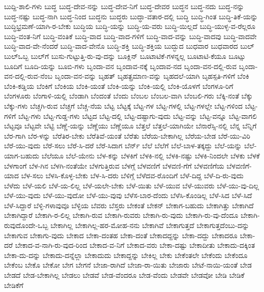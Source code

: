 {ಬುದ್ದಿ-ಶಾಲಿ-ಗಳು
ಬುದ್ಧ
ಬುದ್ಧ-ದೇವ-ನನ್ನು
ಬುದ್ಧ-ದೇವ-ನಿಗೆ
ಬುದ್ಧ-ದೇವರ
ಬುದ್ಧನ
ಬುದ್ಧ-ನದು
ಬುದ್ಧ-ನನ್ನು
ಬುದ್ಧ-ನಷ್ಟು
ಬುದ್ಧ-ನಾಗಿ
ಬುದ್ಧ-ನಿಂದ
ಬುದ್ಧನು
ಬುದ್ಧರು
ಬುದ್ಧಾ-ವತಾರ-ದಲ್ಲಿ
ಬುದ್ಧಿ
ಬುದ್ಧಿ-ಗಿಂತ
ಬುದ್ಧಿ-ತಿಕೆ-ಯನ್ನು
ಬುದ್ಧಿಭ್ರಮಣೆ-ಯಾಗಿ-ರ-ಬೇಕು
ಬುದ್ಧಿಯ
ಬುದ್ಧಿ-ಯನ್ನು
ಬುದ್ಧಿ-ಯ-ವರು
ಬುದ್ಧಿ-ಯಿಲ್ಲದೆ
ಬುದ್ಧಿ-ಯುಳ್ಳ-ವ-ರೆಲ್ಲರೂ
ಬುದ್ಧಿ-ವಂತ-ನಿಗೆ
ಬುದ್ಧಿ-ವಂತಿಕೆ
ಬುದ್ಧಿ-ವಾದ
ಬುದ್ಧಿ-ವಾದ-ಗಳಿಗೆ
ಬುದ್ಧಿ-ವಾದ-ವನ್ನು
ಬುದ್ಧಿ-ವಾದವು
ಬುದ್ಧಿ-ವಾದವೇ
ಬುದ್ಧಿ-ವಾದ-ವೇ-ನೆಂದರೆ
ಬುದ್ಧಿ-ವಾದ-ವೇನೊ
ಬುದ್ಧಿ-ಶಕ್ತಿ
ಬುದ್ಧಿ-ಶಕ್ತಿಯ
ಬುದ್ಭುದ
ಬುಧವಾರ
ಬುಧವಾರದ
ಬುಲ್
ಬುಲ್ಒಬ್ಬ
ಬುಲ್‌ಗೆ
ಬುಸು-ಗುಟ್ಟುತ್ತಿ-ರು-ವು-ದನ್ನು
ಬೂಕ್ಲಿನ್
ಬೂಟಾಟಿಕೆ-ಗಳನ್ನಲ್ಲ
ಬೂಟಾಟಿ-ಕೆಯೂ
ಬೂಟ್ಸು
ಬೂದಿಗೆ
ಬೂದಿ-ಯನ್ನು
ಬೂಬಿ-ಗಳು
ಬೃಂದಾ-ವನ
ಬೃಂದಾವ-ನಕ್ಕೆ
ಬೃಂದಾವ-ನದ
ಬೃಂದಾ-ವನ-ದಲ್ಲಿ-ರುವ
ಬೃಂದಾ-ವನ-ದಲ್ಲಿ-ರುವ-ನೆಂಬ
ಬೃಂದಾ-ವನ-ವನ್ನು
ಬೃಹತ್
ಬೃಹತ್ಪ್ರಮಾಣ-ವನ್ನು
ಬೃಹದಲೆ-ಯಾಗಿ
ಬೃಹಸ್ಪತಿ-ಗಳಿಗೆ
ಬೆಂಕಿ
ಬೆಂಕಿ-ಕಡ್ಡಿಯ
ಬೆಂಕಿಗೆ
ಬೆಂಕಿಯ
ಬೆಂಕಿ-ಯಂತೆ
ಬೆಂಕಿ-ಯನ್ನು
ಬೆಂಕಿ-ಯಲ್ಲಿ
ಬೆಂಕಿ-ಯೊಳಗೆ
ಬೆಂಗಳೂ-ರಿಗೆ
ಬೆಂಗಳೂರು
ಬೆಂಗಾಳಿ-ಯಲ್ಲಿ
ಬೆಂಡಾಗಿ
ಬೆಂದಂತೆ
ಬೆಂದು
ಬೆಂಬಲ
ಬೆಂಬಲ-ವಾಗಿ
ಬೆಂಬಲಿ-ಗರು
ಬೆಕ್ಕಿ-ನಂತೆ
ಬೆಕ್ಕು
ಬೆಕ್ಕು-ಗಳು
ಬೆಚ್ಚಗಿ-ರುವ
ಬೆಚ್ಚಗೆ
ಬೆಚ್ಚ-ನೆಯ
ಬೆಟ್ಟ
ಬೆಟ್ಟಕ್ಕೆ
ಬೆಟ್ಟ-ಗಳ
ಬೆಟ್ಟ-ಗಳಲ್ಲಿ
ಬೆಟ್ಟ-ಗಳಲ್ಲೇ
ಬೆಟ್ಟ-ಗಳಿಂದ
ಬೆಟ್ಟ-ಗಳಿಗೆ
ಬೆಟ್ಟ-ಗಳು
ಬೆಟ್ಟ-ಗುಡ್ಡ-ಗಳು
ಬೆಟ್ಟದ
ಬೆಟ್ಟ-ದಲ್ಲಿ
ಬೆಟ್ಟ-ದಷ್ಟಾಗು-ವುದು
ಬೆಟ್ಟ-ವನ್ನು
ಬೆಟ್ಟ-ವನ್ನೂ
ಬೆಟ್ಟ-ವಾಗಲಿ
ಬೆಟ್ಟವೂ
ಬೆಟ್ಟವೇ
ಬೆಟ್ಟಿ
ಬೆಣ್ಣೆ-ಯನ್ನು
ಬೆಣ್ಣೆಯು
ಬೆಣ್ಣೆಯೂ
ಬೆತ್ತಲೆ
ಬೆತ್ತಲೆ-ಯಾಗಿಯೇ
ಬೆನಾರೆಸ್ಸಿ-ನಲ್ಲಿ
ಬೆನ್ನ
ಬೆನ್ನಿಗೆ
ಬೆರ-ಗಾಗಿ
ಬೆರ-ಳನ್ನು
ಬೆರೆತಿರ-ಬೇಕು
ಬೆರೆತಿವೆ-ಯಂತೆ
ಬೆರೆತು
ಬೆರೆಯ-ಬೇಕಾಗಿಲ್ಲ
ಬೆರೆಯ-ಬೇಡ
ಬೆರೆ-ಯು-ವಿರಿ
ಬೆರೆ-ಯು-ವುದು
ಬೆರೆ-ಸಲು
ಬೆರೆ-ಸಿ-ದರೆ
ಬೆರೆ-ಸಿದಾಗ
ಬೆರ್ನ್
ಬೆಲೆ
ಬೆಲೆಗೆ
ಬೆಲೆ-ಬಾಳ-ತಕ್ಕದ್ದು
ಬೆಲೆ-ಯನ್ನು
ಬೆಲೆ-ಯಾಗ-ಬಹುದು
ಬೆಲೆಯೂ
ಬೆಲೆ-ಯೇನು
ಬೆಳ-ಕನ್ನು
ಬೆಳಕಿಗೆ
ಬೆಳಕಿ-ನಲ್ಲಿ
ಬೆಳಕಿ-ನಷ್ಟು
ಬೆಳಕಿ-ನಿಂದಲೇ
ಬೆಳಕು
ಬೆಳಕೆ
ಬೆಳಗಾಂಗೆ
ಬೆಳ-ಗಿನ
ಬೆಳಗಿ-ನಂತೆಯೇ
ಬೆಳಗುತ್ತಿರುವ
ಬೆಳಗ್ಗೆ
ಬೆಳವಣಿಗೆ
ಬೆಳವಣಿ-ಗೆಗೆ
ಬೆಳವಣಿಗೆಯ
ಬೆಳವಣಿಗೆ-ಯಾದ
ಬೆಳ-ಸಲು
ಬೆಳಸಿ-ಕೊಳ್ಳ-ಬೇಕು
ಬೆಳ-ಸಿ-ದರು
ಬೆಳಿಗ್ಗೆ
ಬೆಳೆದವ-ರೊಂದಿಗೆ
ಬೆಳೆ-ದಿದ್ದ
ಬೆಳೆ-ದಿ-ರು-ವುದು
ಬೆಳೆದು
ಬೆಳೆ-ಯಲಿ
ಬೆಳೆ-ಯ-ಲಿಲ್ಲ
ಬೆಳೆ-ಯಲೇ-ಬೇಕು
ಬೆಳೆ-ಯಿತು
ಬೆಳೆ-ಯುವ
ಬೆಳೆ-ಯುವರು
ಬೆಳೆ-ಯು-ವು-ದಿಲ್ಲ
ಬೆಳೆ-ಯು-ವುದು
ಬೆಳೆ-ಯು-ವುದೋ
ಬೆಳೆ-ಯು-ವುವು
ಬೆಳೆಸ-ಬಾರ-ದೆಂದು
ಬೆಳೆಸಿ-ಕೊಂಡಿಲ್ಲ
ಬೆಳೆ-ಸಿದ
ಬೆಳೆ-ಸಿದೆ
ಬೆಳೆ-ಸಿದ್ದಾರೆ
ಬೆಳ್ಳಿ-ಗಳಾವುವೂ
ಬೆಳ್ಳಿಯ
ಬೆವರು
ಬೆಸ್ತರು
ಬೇಕಂತೆ
ಬೇಕನ್
ಬೇಕಾಗ-ಬಹುದು
ಬೇಕಾಗಿತ್ತು
ಬೇಕಾಗಿದೆ
ಬೇಕಾಗಿದ್ದಾರೆ
ಬೇಕಾಗಿ-ರ-ಲಿಲ್ಲ
ಬೇಕಾಗಿ-ರುವ
ಬೇಕಾಗಿ-ರುವರು
ಬೇಕಾಗಿ-ರು-ವುದು
ಬೇಕಾಗಿ-ರು-ವು-ದೆಂದೂ
ಬೇಕಾಗಿ-ರುವುದೊಂದೇ-ಒಬ್ಬ
ಬೇಕಾಗಿಲ್ಲ
ಬೇಕಾಗಿಲ್ಲ-ಹರ-ಮೋಹ-ನನು
ಬೇಕಾಗಿವೆ
ಬೇಕಾಗುತ್ತದೆ
ಬೇಕಾಗುತ್ತದೆಂಬು-ದನ್ನು
ಬೇಕಾಗುವ
ಬೇಕಾಗು-ವುದು
ಬೇಕಾದ
ಬೇಕಾ-ದಂತಹ
ಬೇಕಾ-ದಂತೆ
ಬೇಕಾದದ್ದನ್ನು
ಬೇಕಾ-ದದ್ದು
ಬೇಕಾದರೂ
ಬೇಕಾ-ದರೆ
ಬೇಕಾದ-ವ-ನಾಗಿ-ರು-ವುದ-ರಿಂದ
ಬೇಕಾದ-ವ-ನಿಗೆ
ಬೇಕಾದ-ವರು
ಬೇಕಾ-ದಷ್ಟು
ಬೇಕಾದೀತು
ಬೇಕಾದು-ದಕ್ಕಿಂತ
ಬೇಕಾ-ದು-ದನ್ನು
ಬೇಕಾದು-ದನ್ನೆಲ್ಲಾ
ಬೇಕಾದುದು
ಬೇಕಾದ್ದನ್ನು
ಬೇಕಿಲ್ಲ
ಬೇಕು
ಬೇಕೆಂತಲೇ
ಬೇಕೆಂದು
ಬೇಕೆಂದೂ
ಬೇಕೆಂಬ
ಬೇಕೊ
ಬೇಕೋ
ಬೇಗ
ಬೇಗನೆ
ಬೇಜಾ-ರಾಗಿದೆ
ಬೇಜಾ-ರಾ-ಯಿತು
ಬೇಜಾರು
ಬೇಟೆ-ನಾಯಿ-ಯಂತೆ
ಬೇಡ
ಬೇಡದೆ
ಬೇಡ-ಬೇಕಾಗಿಲ್ಲ
ಬೇಡಲು
ಬೇಡವೆ
ಬೇಡ-ವೆಂದರೂ
ಬೇಡ-ವೆಂದು
ಬೇಡವೇ
ಬೇಡವೋ
ಬೇಡಿ
ಬೇಡಿಕೆ
ಬೇಡಿಕೆಗೆ
}
